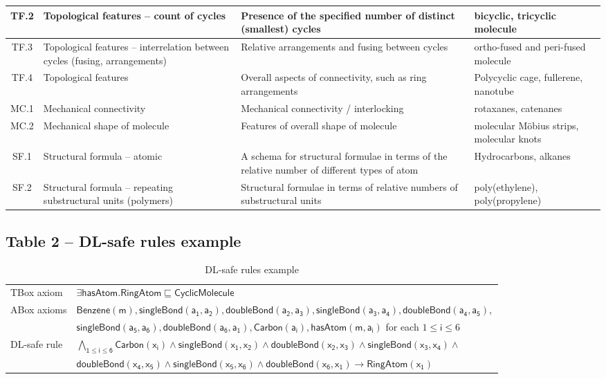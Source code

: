 \documentclass[10pt]{bmc_article}
\newenvironment{bmcformat}{\baselineskip20pt\sloppy\setboolean{publ}{false}}{\baselineskip20pt\sloppy}
\begin{document}
\begin{bmcformat}
{\begin{tabular}{|c|p{3cm}|p{5cm}|p{4cm}|}
        TF.2 & Topological features -- count of cycles  & Presence of the specified number of distinct (smallest) cycles & bicyclic, tricyclic molecule \\ \hline
        TF.3 & Topological features -- interrelation between cycles (fusing, arrangements)  & Relative arrangements and fusing between cycles  & ortho-fused and peri-fused molecule \\ \hline
        TF.4 & Topological features & Overall aspects of connectivity, such as ring arrangements & Polycyclic cage, fullerene, nanotube \\ \hline
        MC.1 & Mechanical connectivity & Mechanical connectivity / interlocking & rotaxanes, catenanes \\ \hline
        MC.2 & Mechanical shape of molecule & Features of overall shape of molecule & molecular M\"{o}bius strips, molecular knots  \\ \hline
        SF.1 & Structural formula -- atomic & A schema for structural formulae in terms of the relative number of different types of atom & Hydrocarbons, alkanes \\ \hline
        SF.2 & Structural formula -- repeating substructural units (polymers) & Structural formulae in terms of relative numbers of substructural units & poly(ethylene), poly(propylene) \\ \hline
      \end{tabular}
      } 



\subsection*{Table 2 -- DL-safe rules example}
\begin{table}[h!]
\centering
\caption{DL-safe rules example}\label{tab:DL-safe-example}
\begin{tabular}{|l|l|}
    \hline
    TBox axiom    & $\mathsf{\exists hasAtom.RingAtom \sqsubseteq CyclicMolecule}$ \\
    ABox axioms & $\mathsf{Benzene(m),singleBond(a_1,a_2),doubleBond(a_2,a_3),singleBond(a_3,a_4),doubleBond(a_4,a_5),}$ \\ 
     & $\mathsf{singleBond(a_5,a_6),doubleBond(a_6,a_1),Carbon(a_i),hasAtom(m,a_i)}$  for each $ 1 \leq \mathsf{i} \leq 6$ \\
     DL-safe rule &  $\mathsf{ \bigwedge_{1 \leq i \leq 6}   Carbon(x_i)   \wedge singleBond(x_1,x_2) \wedge doubleBond(x_2,x_3) \wedge singleBond(x_3,x_4)} \wedge{}$ \\
     & $\mathsf{doubleBond(x_4,x_5) \wedge singleBond(x_5,x_6) \wedge doubleBond(x_6,x_1) \rightarrow RingAtom(x_1)}$ \\
      

\end{tabular}
\end{table}
\end{bmcformat}
\end{document}
